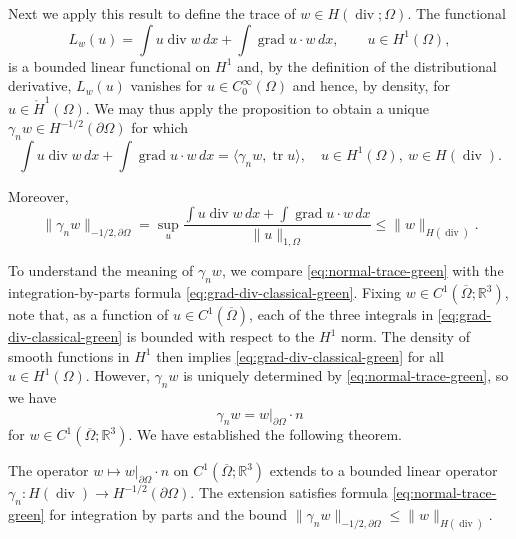{Next we apply this result to define the trace of $w\in H(\operatorname{div};\Omega)$. The functional}
\[
L_w(u)=\int u\operatorname{div}w\,dx+\int\operatorname{grad}u\cdot w\,dx,\qquad u\in H^1(\Omega),
\]
{is a bounded linear functional on $H^1$ and, by the definition of the distributional derivative, $L_w(u)$ vanishes for $u\in C_0^\infty(\Omega)$ and hence, by density, for $u\in\mathring H^1(\Omega)$. We may thus apply the proposition to obtain a unique $\gamma_n w\in H^{-1/2}(\partial\Omega)$ for which}
\begin{equation}\label{eq:normal-trace-green}
\int u\operatorname{div}w\,dx+\int\operatorname{grad}u\cdot w\,dx=\langle\gamma_n w,\operatorname{tr}u\rangle,\quad u\in H^1(\Omega),\ w\in H(\operatorname{div}).
\end{equation}

{Moreover,}
\[
\|\gamma_n w\|_{-1/2,\partial\Omega}=\sup_u\frac{\int u\operatorname{div}w\,dx+\int\operatorname{grad}u\cdot w\,dx}{\|u\|_{1,\Omega}}\leq\|w\|_{H(\operatorname{div})}.
\]

{To understand the meaning of $\gamma_n w$, we compare \eqref{eq:normal-trace-green} with the integration-by-parts formula \eqref{eq:grad-div-classical-green}. Fixing $w\in C^1(\overline\Omega;\mathbb R^3)$, note that, as a function of $u\in C^1(\overline\Omega)$, each of the three integrals in \eqref{eq:grad-div-classical-green} is bounded with respect to the $H^1$ norm. The density of smooth functions in $H^1$ then implies \eqref{eq:grad-div-classical-green} for all $u\in H^1(\Omega)$. However, $\gamma_n w$ is uniquely determined by \eqref{eq:normal-trace-green}, so we have}
\[
\gamma_n w=w|_{\partial\Omega}\cdot n
\]
{for $w\in C^1(\overline\Omega;\mathbb R^3)$. We have established the following theorem.}

\begin{Theorem}\label{thm:normal-trace-extension}
{The operator $w\mapsto w|_{\partial\Omega}\cdot n$ on $C^1(\overline\Omega;\mathbb R^3)$ extends to a bounded linear operator $\gamma_n:H(\operatorname{div})\to H^{-1/2}(\partial\Omega)$. The extension satisfies formula \eqref{eq:normal-trace-green} for integration by parts and the bound $\|\gamma_n w\|_{-1/2,\partial\Omega}\leq\|w\|_{H(\operatorname{div})}$.}
\end{Theorem}

